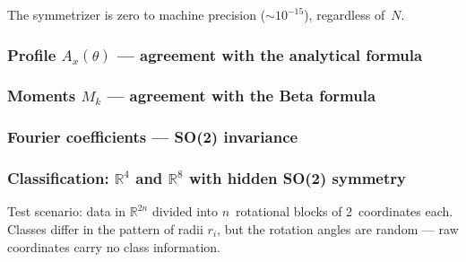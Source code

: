 \documentclass[11pt,a4paper]{report}
\begin{document}
\noindent{}


The symmetrizer is zero to machine precision (${\sim}10^{-15}$), regardless of~$N$.

\subsubsection{Profile $A_x(\theta)$ --- agreement with the analytical formula}

\noindent{}


\subsubsection{Moments $M_k$ --- agreement with the Beta formula}

\noindent{}


\subsubsection{Fourier coefficients --- SO(2) invariance}

\noindent{}


\subsubsection{Classification: $\mathbb{R}^4$ and $\mathbb{R}^8$ with hidden SO(2) symmetry}

Test scenario: data in $\mathbb{R}^{2n}$ divided into $n$~rotational blocks of 2~coordinates each. Classes differ in the pattern of radii $r_i$, but the rotation angles are random --- raw coordinates carry no class information.

\noindent{}


\noindent{}
\end{document}
